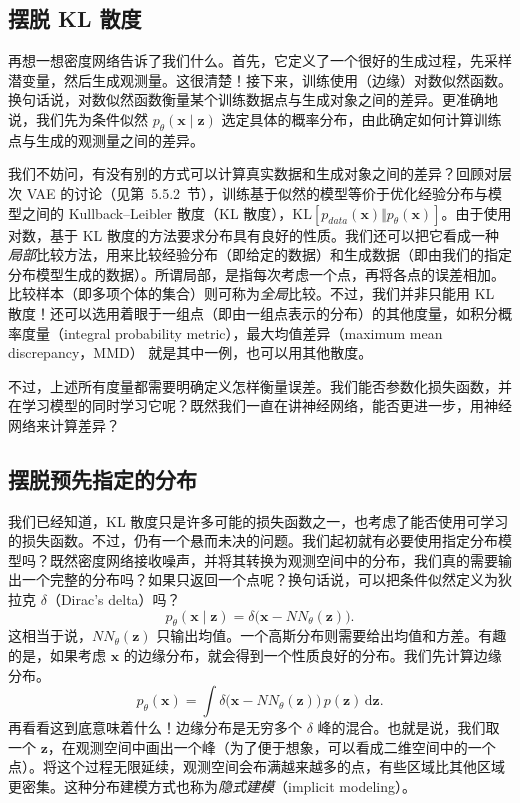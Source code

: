 \subsection{摆脱 KL 散度}

再想一想密度网络告诉了我们什么。首先，它定义了一个很好的生成过程，先采样潜变量，然后生成观测量。这很清楚！接下来，训练使用（边缘）对数似然函数。换句话说，对数似然函数衡量某个训练数据点与生成对象之间的差异。更准确地说，我们先为条件似然 $p_\theta(\mathbf x\mid\mathbf z)$ 选定具体的概率分布，由此确定如何计算训练点与生成的观测量之间的差异。

我们不妨问，有没有别的方式可以计算真实数据和生成对象之间的差异？回顾对层次 VAE 的讨论（见第~5.5.2~节），训练基于似然的模型等价于优化经验分布与模型之间的 Kullback–Leibler 散度（KL 散度），$\mathrm{KL}[p_{\mathit{data}}(\mathbf x)\Vert p_\theta(\mathbf x)]$。由于使用对数，基于 KL 散度的方法要求分布具有良好的性质。我们还可以把它看成一种\emph{局部}比较方法，用来比较经验分布（即给定的数据）和生成数据（即由我们的指定分布模型生成的数据）。所谓局部，是指每次考虑一个点，再将各点的误差相加。比较样本（即多项个体的集合）则可称为\emph{全局}比较。不过，我们并非只能用 KL 散度！还可以选用着眼于一组点（即由一组点表示的分布）的其他度量，如积分概率度量（integral probability metric），最大均值差异（maximum mean discrepancy，MMD） 就是其中一例，也可以用其他散度。

不过，上述所有度量都需要明确定义怎样衡量误差。我们能否参数化损失函数，并在学习模型的同时学习它呢？既然我们一直在讲神经网络，能否更进一步，用神经网络来计算差异？

\subsection{摆脱预先指定的分布}

我们已经知道，KL 散度只是许多可能的损失函数之一，也考虑了能否使用可学习的损失函数。不过，仍有一个悬而未决的问题。我们起初就有必要使用指定分布模型吗？既然密度网络接收噪声，并将其转换为观测空间中的分布，我们真的需要输出一个完整的分布吗？如果只返回一个点呢？换句话说，可以把条件似然定义为狄拉克 $\delta$（Dirac's delta）吗？
\begin{equation}
  p_\theta(\mathbf x\mid\mathbf z)=\delta\bigl(\mathbf x-NN_\theta(\mathbf z)\bigr).
  \tag{8.6}\label{eq:08-06}
\end{equation}
这相当于说，$NN_\theta(\mathbf z)$ 只输出均值。一个高斯分布则需要给出均值和方差。有趣的是，如果考虑 $\mathbf x$ 的边缘分布，就会得到一个性质良好的分布。我们先计算边缘分布。
\begin{equation}
  p_\theta(\mathbf x)=
  \int\delta\bigl(\mathbf x-NN_\theta(\mathbf z)\bigr)\,p(\mathbf z)\,\mathrm d\mathbf z.
  \tag{8.7}\label{eq:08-07}
\end{equation}
再看看这到底意味着什么！边缘分布是无穷多个 $\delta$ 峰的混合。也就是说，我们取一个 $\mathbf z$，在观测空间中画出一个峰（为了便于想象，可以看成二维空间中的一个点）。将这个过程无限延续，观测空间会布满越来越多的点，有些区域比其他区域更密集。这种分布建模方式也称为\emph{隐式建模}（implicit modeling）。

